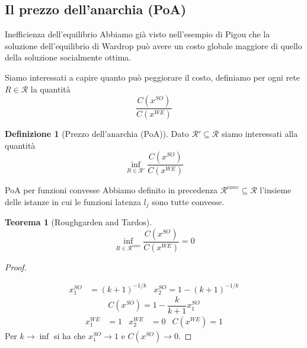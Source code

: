 \documentclass{beamer}
\newcounter{counter1}
\theoremstyle{plain}
\newtheorem{myteo}[counter1]{Teorema}
\theoremstyle{definition}
\newtheorem{mydef}[counter1]{Definizione}
\theoremstyle{remark}
\newcommand{\pa}[1]{\left(#1\right)}
\begin{document}
\subsection{Il prezzo dell'anarchia (PoA)}

\begin{frame}{Inefficienza dell'equilibrio}
  Abbiamo già visto nell'esempio di Pigou che la soluzione
  dell'equilibrio di Wardrop può avere un costo globale maggiore di
  quello della soluzione socialmente ottima.

  Siamo interessati a capire quanto può peggiorare il costo, definiamo
  per ogni rete $R \in \mathcal{R}$ la quantità
  \[ \frac{C\pa{ x^{SO}}}{C\pa{ x^{WE}}} \]
  \begin{mydef}[Prezzo dell'anarchia (PoA)]
    Dato $\mathcal{R}' \subseteq \mathcal{R}$ siamo interessati alla
    quantità
    \[ \inf _{R\in \mathcal{R}'} \frac{C\pa{ x^{SO}}}{C\pa{
          x^{WE}}} \]
  \end{mydef}
\end{frame}

\begin{frame}{PoA per funzioni convesse}
  Abbiamo definito in precedenza $\mathcal{R}^{conv} \subseteq
  \mathcal{R}$ l'insieme delle istanze in cui le funzioni latenza
  $l_j$ sono tutte convesse.
  \begin{myteo}[Roughgarden and Tardos]
    \[ \inf _{R\in \mathcal{R}^{conv}} \frac{C\pa{ x^{SO}}}{C\pa{
          x^{WE}}} = 0 \]
  \end{myteo}
\end{frame}

\begin{frame}
  \begin{proof}
    \begin{center}
    \end{center}
    \vspace{-25px}
    \begin{align*}
      x^{SO}_1 &= \pa{k+1}^{-1/k} & x^{SO}_2 = 1- \pa{k+1}^{-1/k}
    \end{align*}
    \[ C\pa{x^{SO}} = 1 - \frac{k}{k+1}x^{SO}_1 \]
    \begin{align*}
      x^{WE}_1 &= 1 & x^{WE}_2 &= 0 & C\pa{x^{WE}} = 1
    \end{align*}
    Per $k\to \inf$ si ha che $x^{SO}_1 \to 1$ e $C\pa{x^{SO}}\to 0$.
  \end{proof}
\end{frame}
\end{document}
